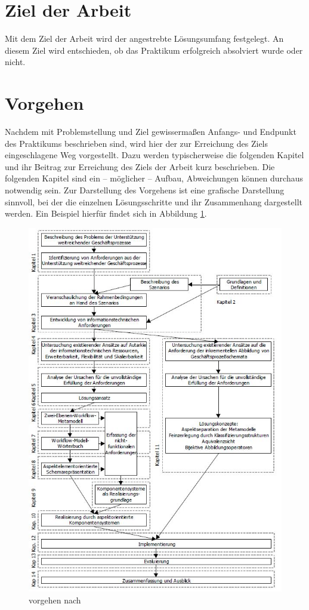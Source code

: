 \documentclass[oneside]{ausarbeitung}
\begin{document}
\section{Ziel der Arbeit}
\label{sec:ziel}

Mit dem Ziel der Arbeit wird der angestrebte Lösungsumfang festgelegt. An diesem Ziel wird entschieden, ob das Praktikum erfolgreich absolviert wurde oder nicht.

\section{Vorgehen}
\label{sec:vorgehen}

Nachdem mit Problemstellung und Ziel gewissermaßen Anfangs- und Endpunkt 
des Praktikums beschrieben sind, wird hier der zur Erreichung des Ziels 
eingeschlagene Weg vorgestellt. Dazu werden typischerweise die folgenden 
Kapitel und ihr Beitrag zur Erreichung des Ziels der Arbeit kurz 
beschrieben. Die folgenden Kapitel sind ein – möglicher – Aufbau, 
Abweichungen können durchaus notwendig sein. Zur Darstellung des 
Vorgehens ist eine grafische Darstellung sinnvoll, bei der die einzelnen 
Lösungsschritte und ihr Zusammenhang dargestellt werden. Ein Beispiel 
hierfür findet sich in Abbildung \ref{fig:1}.

\begin{figure}[htbp]
  \centering
  \includegraphics[height=0.9\textheight]{images/ausarbeitung.jpg}
  \caption{vorgehen nach \autocite{Schmidt:Geschaeftsprozesse}}
  \label{fig:1}
\end{figure}
\end{document}
